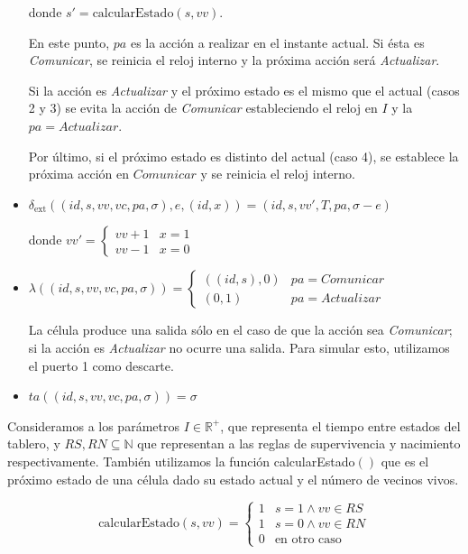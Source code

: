 \documentclass[12pt]{article}
\newcommand{\dext}{\delta_{\text{ext}}}
\newcommand{\estado}{(id, s, vv, vc, pa, \sigma)}
\newcommand{\R}{\mathbb{R}}
\newcommand{\N}{\mathbb{N}}
\begin{document}
\begin{itemize}
    donde $s' = \text{calcularEstado}(s, vv)$.

    En este punto, $pa$ es la acción a realizar en el instante actual. Si ésta es \textit{Comunicar}, se reinicia el reloj interno y la próxima acción será \textit{Actualizar}.

    Si la acción es \textit{Actualizar} y el próximo estado es el mismo que el actual (casos 2 y 3) se evita la acción de \textit{Comunicar} estableciendo el reloj en $I$ y la $pa = Actualizar$.

    Por último, si el próximo estado es distinto del actual (caso 4), se establece la próxima acción en $Comunicar$ y se reinicia el reloj interno.

  \item $\dext(\estado, e, (id, x)) = (id, s, vv', T, pa, \sigma - e)$

    donde $vv' = \begin{cases}
      vv + 1 & x = 1 \\
      vv - 1 & x = 0
    \end{cases}$

  \item $\lambda(\estado) = \begin{cases}
      ((id, s), 0) & pa = Comunicar \\
      (0, 1) & pa = Actualizar
    \end{cases}$

    La célula produce una salida sólo en el caso de que la acción sea \textit{Comunicar}; si la acción es \textit{Actualizar} no ocurre una salida. Para simular esto, utilizamos el puerto 1 como descarte.

  \item $ta(\estado) = \sigma$
\end{itemize}

Consideramos a los parámetros $I \in \R^+$, que representa el tiempo entre estados del tablero, y $RS, RN \subseteq \N$ que representan a las reglas de supervivencia y nacimiento respectivamente. También utilizamos la función calcularEstado$()$ que es el próximo estado de una célula dado su estado actual y el número de vecinos vivos.

\[ \text{calcularEstado}(s, vv) = \begin{cases}
  1 & s = 1 \land vv \in RS \\
  1 & s = 0 \land vv \in RN \\
  0 & \text{en otro caso}
\end{cases}\]
\end{document}

